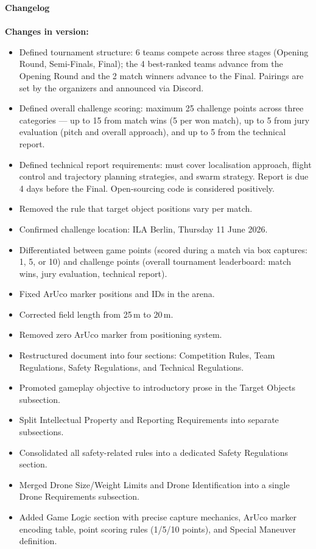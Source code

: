 \newpage
{\bf Changelog}
\\ \\{\bf Changes in version: \getVersion{}}
\begin{itemize}
	\item{Defined tournament structure: 6 teams compete across three stages (Opening Round, Semi-Finals, Final); the 4 best-ranked teams advance from the Opening Round and the 2 match winners advance to the Final. Pairings are set by the organizers and announced via Discord.}
	\item{Defined overall challenge scoring: maximum 25 challenge points across three categories — up to 15 from match wins (5 per won match), up to 5 from jury evaluation (pitch and overall approach), and up to 5 from the technical report.}
	\item{Defined technical report requirements: must cover localisation approach, flight control and trajectory planning strategies, and swarm strategy. Report is due 4 days before the Final. Open-sourcing code is considered positively.}
	\item{Removed the rule that target object positions vary per match.}
	\item{Confirmed challenge location: ILA Berlin, Thursday 11 June 2026.}
	\item{Differentiated between game points (scored during a match via box captures: 1, 5, or 10) and challenge points (overall tournament leaderboard: match wins, jury evaluation, technical report).}
	\item{Fixed ArUco marker positions and IDs in the arena.}
	\item{Corrected field length from 25\,m to 20\,m.}
	\item{Removed zero ArUco marker from positioning system.}
	\item{Restructured document into four sections: Competition Rules, Team Regulations, Safety Regulations, and Technical Regulations.}
	\item{Promoted gameplay objective to introductory prose in the Target Objects subsection.}
	\item{Split Intellectual Property and Reporting Requirements into separate subsections.}
	\item{Consolidated all safety-related rules into a dedicated Safety Regulations section.}
	\item{Merged Drone Size/Weight Limits and Drone Identification into a single Drone Requirements subsection.}
	\item{Added Game Logic section with precise capture mechanics, ArUco marker encoding table, point scoring rules (1/5/10 points), and Special Maneuver definition.}
\end{itemize}
\newpage
